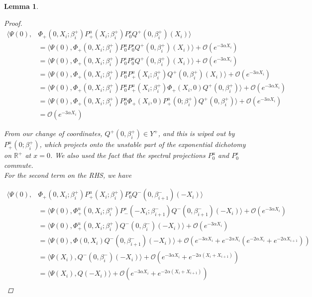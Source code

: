 \documentclass[12pt]{article}
\def\R{{\mathbb R}}
\newtheorem{lemma}{Lemma}
\begin{document}
\begin{lemma}
\begin{proof}
\begin{align*}
\langle \Psi(0), &\Phi_+(0, X_i; \beta_i^+) P^u_+(X_i; \beta_i^+) P^s_0 Q^+(0, \beta_i^+)(X_i) \rangle \\
&= \langle \Psi(0), \Phi_+(0, X_i; \beta_i^+) P^u_0 P^s_0 Q^+(0, \beta_i^+)(X_i) \rangle + \mathcal{O}(e^{-3 \alpha X_i}) \\
&= \langle \Psi(0), \Phi_+(0, X_i; \beta_i^+) P^s_0 P^u_0 Q^+(0, \beta_i^+)(X_i) \rangle + \mathcal{O}(e^{-3 \alpha X_i}) \\
&= \langle \Psi(0), \Phi_+(0, X_i; \beta_i^+) P^u_0 P^u_+(X_i; \beta_i^+) Q^+(0, \beta_i^+)(X_i) \rangle + \mathcal{O}(e^{-3 \alpha X_i}) \\
&= \langle \Psi(0), \Phi_+(0, X_i; \beta_i^+) P^u_0 P^u_+(X_i; \beta_i^+) \Phi_+(X_i, 0) Q^+(0, \beta_i^+)\rangle + \mathcal{O}(e^{-3 \alpha X_i}) \\
&= \langle \Psi(0), \Phi_+(0, X_i; \beta_i^+) P^u_0 \Phi_+(X_i, 0) P^u_+(0; \beta_i^+) Q^+(0, \beta_i^+)\rangle + \mathcal{O}(e^{-3 \alpha X_i}) \\
&= \mathcal{O}(e^{-3 \alpha X_i})
\end{align*}

From our change of coordinates, $Q^+(0, \beta_i^+) \in Y^+$, and this is wiped out by $P^u_+(0; \beta_i^+)$, which projects onto the unstable part of the exponential dichotomy on $\R^+$ at $x = 0$. We also used the fact that the spectral projections $P^u_0$ and $P^s_0$ commute. \\

For the second term on the RHS, we have

\begin{align*}
\langle \Psi(0), &\Phi_+(0, X_i; \beta_i^+) P^u_+(X_i; \beta_i^+) P^s_0 Q^-(0, \beta_{i+1}^-)(-X_i) \rangle \\
&= \langle \Psi(0), \Phi_+^u(0, X_i; \beta_i^+) P^s_-(-X_i; \beta_{i+1}^-) Q^-(0, \beta_{i+1}^-)(-X_i) \rangle + \mathcal{O}(e^{-3 \alpha X_i}) \\
&= \langle \Psi(0), \Phi_+^u(0, X_i; \beta_i^+) Q^-(0, \beta_i^-)(-X_i) \rangle + \mathcal{O}(e^{-3 \alpha X_i}) \\
&= \langle \Psi(0), \Phi(0, X_i) Q^-(0, \beta_{i+1}^-)(-X_i) \rangle + \mathcal{O}(e^{-3 \alpha X_i} + e^{-2 \alpha X_i} (e^{-2 \alpha X_i} + e^{-2 \alpha X_{i+1}})) \\
&= \langle \Psi(X_i), Q^-(0, \beta_i^-)(-X_i) \rangle + \mathcal{O}(e^{-3 \alpha X_i} + e^{-2 \alpha (X_i + X_{i+1})}) \\
&= \langle \Psi(X_i), Q(-X_i) \rangle + \mathcal{O}(e^{-3 \alpha X_i} + e^{-2 \alpha (X_i + X_{i+1})}) \\
\end{align*}


\end{proof}
\end{lemma}
\end{document}
